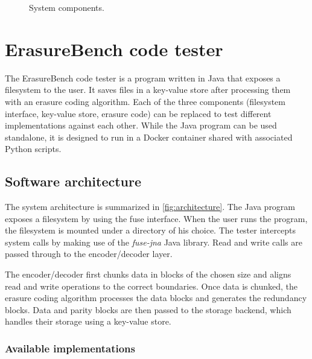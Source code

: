 \begin{figure}
    \centering
    
    \caption{System components.}
    \label{fig:architecture}
\end{figure}

\section{ErasureBench code tester}

\label{sec:erasure-tester}

The ErasureBench code tester is a program written in Java that exposes a filesystem to the user.
It saves files in a key-value store after processing them with an erasure coding algorithm.
Each of the three components (filesystem interface, key-value store, erasure code) can be replaced to test different implementations against each other. While the Java program can be used standalone, it is designed to run in a Docker container shared with associated Python scripts.

\subsection{Software architecture}
\label{subsec:architecture}

The system architecture is summarized in \autoref{fig:architecture}. The Java program exposes a filesystem by using the \ac{fuse} interface. When the user runs the program, the filesystem is mounted under a directory of his choice. The tester intercepts system calls by making use of the \textit{fuse-jna} \autocite{fuse-jna} Java library. Read and write calls are passed through to the encoder/decoder layer.

The encoder/decoder first chunks data in blocks of the chosen size and aligns read and write operations to the correct boundaries. Once data is chunked, the erasure coding algorithm processes the data blocks and generates the redundancy blocks. Data and parity blocks are then passed to the storage backend, which handles their storage using a key-value store.

\subsubsection{Available implementations}

